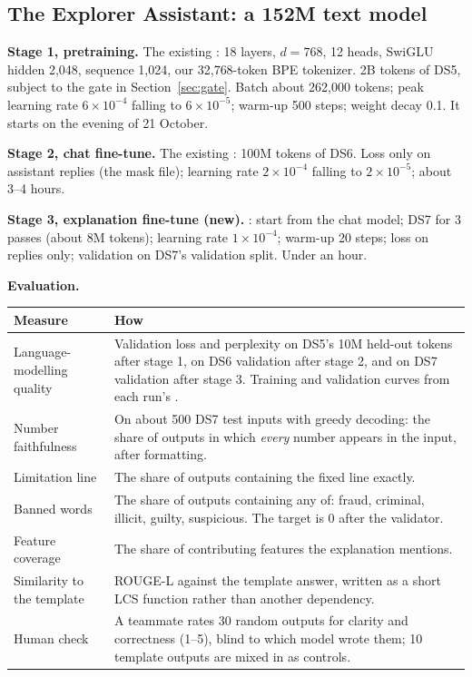 \subsection{The Explorer Assistant: a 152M text model}
\label{sec:assistant}

\textbf{Stage 1, pretraining.} The existing : 18 layers,
$d=768$, 12 heads, SwiGLU hidden 2,048, sequence 1,024, our 32,768-token BPE tokenizer. 2B tokens
of DS5, subject to the gate in Section~\ref{sec:gate}. Batch about 262,000 tokens; peak learning
rate $6\times10^{-4}$ falling to $6\times10^{-5}$; warm-up 500 steps; weight decay 0.1. It starts
on the evening of 21 October.

\textbf{Stage 2, chat fine-tune.} The existing : 100M tokens of
DS6. Loss only on assistant replies (the mask file); learning rate $2\times10^{-4}$ falling to
$2\times10^{-5}$; about 3--4 hours\est{}.

\textbf{Stage 3, explanation fine-tune (new).} : start from
the chat model; DS7 for 3 passes (about 8M tokens\est{}); learning rate $1\times10^{-4}$; warm-up
20 steps; loss on replies only; validation on DS7's validation split. Under an hour\est{}.

\textbf{Evaluation.}
\begin{center}
\small
\begin{tabularx}{\textwidth}{@{}L{4.0cm}Y@{}}
\toprule
\textbf{Measure} & \textbf{How} \\
\midrule
Language-modelling quality & Validation loss and perplexity on DS5's 10M held-out tokens after stage 1, on DS6 validation after stage 2, and on DS7 validation after stage 3. Training and validation curves from each run's . \\
Number faithfulness & On about 500 DS7 test inputs with greedy decoding: the share of outputs in which \emph{every} number appears in the input, after formatting. \\
Limitation line & The share of outputs containing the fixed line exactly. \\
Banned words & The share of outputs containing any of: fraud, criminal, illicit, guilty, suspicious. The target is 0 after the validator. \\
Feature coverage & The share of contributing features the explanation mentions. \\
Similarity to the template & ROUGE-L against the template answer, written as a short LCS function rather than another dependency. \\
Human check & A teammate rates 30 random outputs for clarity and correctness (1--5), blind to which model wrote them; 10 template outputs are mixed in as controls. \\
\bottomrule
\end{tabularx}
\end{center}

